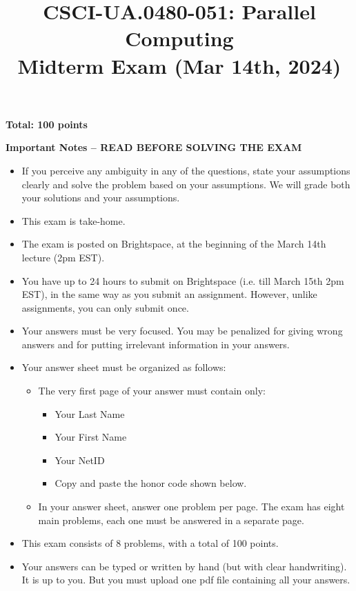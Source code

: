 \documentclass{article}
\begin{document}
\title{CSCI-UA.0480-051: Parallel Computing \\ Midterm Exam (Mar 14th, 2024)}
\author{}
\date{}
\maketitle

\textbf{Total: 100 points}

\textbf{Important Notes -- READ BEFORE SOLVING THE EXAM}

\begin{itemize}
    \item If you perceive any ambiguity in any of the questions, state your assumptions clearly and solve the problem based on your assumptions. We will grade both your solutions and your assumptions.
    \item This exam is take-home.
    \item The exam is posted on Brightspace, at the beginning of the March 14th lecture (2pm EST).
    \item You have up to 24 hours to submit on Brightspace (i.e. till March 15th 2pm EST), in the same way as you submit an assignment. However, unlike assignments, you can only submit once.
    \item Your answers must be very focused. You may be penalized for giving wrong answers and for putting irrelevant information in your answers.
    \item Your answer sheet must be organized as follows:
    \begin{itemize}
        \item The very first page of your answer must contain only:
        \begin{itemize}
            \item Your Last Name
            \item Your First Name
            \item Your NetID
            \item Copy and paste the honor code shown below.
        \end{itemize}
        \item In your answer sheet, answer one problem per page. The exam has eight main problems, each one must be answered in a separate page.
    \end{itemize}
    \item This exam consists of 8 problems, with a total of 100 points.
    \item Your answers can be typed or written by hand (but with clear handwriting). It is up to you. But you must upload one pdf file containing all your answers.
\end{itemize}
\end{document}
